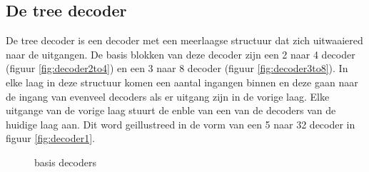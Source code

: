 \subsection{De tree decoder}
De tree decoder is een decoder met een meerlaagse structuur dat zich uitwaaiered naar de uitgangen. De basis blokken van deze decoder zijn een 2 naar 4 decoder (figuur \ref{fig:decoder2to4}) en een 3 naar 8 decoder (figuur \ref{fig:decoder3to8}). In elke laag in deze structuur komen een aantal ingangen binnen en deze gaan naar de ingang van evenveel decoders als er uitgang zijn in de vorige laag. Elke uitgange van de vorige laag stuurt de enble van een van de decoders van de huidige laag aan. Dit word geillustreed in de vorm van een 5 naar 32 decoder in figuur \ref{fig:decoder1}. 
\begin{figure}[h!]
\centering
{}
\caption{basis decoders}
\end{figure}

